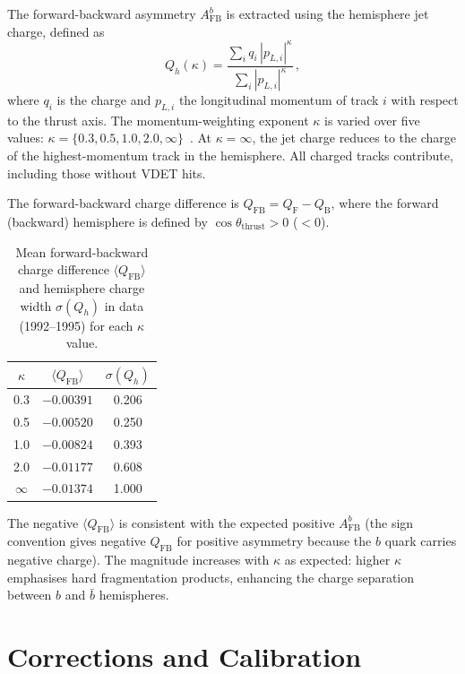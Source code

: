 \documentclass[11pt,a4paper]{article}
\begin{document}
The forward-backward asymmetry $A_\text{FB}^b$ is extracted using
the hemisphere jet charge, defined as
\begin{equation}
Q_h(\kappa) = \frac{\sum_i q_i\, |p_{L,i}|^\kappa}
                    {\sum_i |p_{L,i}|^\kappa}\,,
\label{eq:jet_charge}
\end{equation}
where $q_i$ is the charge and $p_{L,i}$ the longitudinal momentum
of track $i$ with respect to the thrust axis.
The momentum-weighting exponent $\kappa$ is varied over five values:
$\kappa = \{0.3, 0.5, 1.0, 2.0, \infty\}$~\cite{ALEPH:AFBb}.
At $\kappa = \infty$, the jet charge reduces to the charge of the
highest-momentum track in the hemisphere.
All charged tracks contribute, including those without VDET hits.

The forward-backward charge difference is
$Q_\text{FB} = Q_\text{F} - Q_\text{B}$,
where the forward (backward) hemisphere is defined by
$\cos\theta_\text{thrust} > 0$ ($< 0$).

\begin{table}[htbp]
\centering
\caption{Mean forward-backward charge difference $\langle Q_\text{FB}\rangle$
and hemisphere charge width $\sigma(Q_h)$ in data (1992--1995) for
each $\kappa$ value.}
\label{tbl:qfb}
\begin{tabular}{ccc}
\toprule
$\kappa$ & $\langle Q_\text{FB}\rangle$ & $\sigma(Q_h)$ \\
\midrule
0.3     & $-0.00391$ & 0.206 \\
0.5     & $-0.00520$ & 0.250 \\
1.0     & $-0.00824$ & 0.393 \\
2.0     & $-0.01177$ & 0.608 \\
$\infty$& $-0.01374$ & 1.000 \\
\bottomrule
\end{tabular}
\end{table}

The negative $\langle Q_\text{FB}\rangle$ is consistent with the
expected positive $A_\text{FB}^b$ (the sign convention gives
negative $Q_\text{FB}$ for positive asymmetry because the $b$
quark carries negative charge).
The magnitude increases with $\kappa$ as expected: higher $\kappa$
emphasises hard fragmentation products, enhancing the charge
separation between $b$ and $\bar{b}$ hemispheres.

\section{Corrections and Calibration}
\label{sec:corrections}
\end{document}
